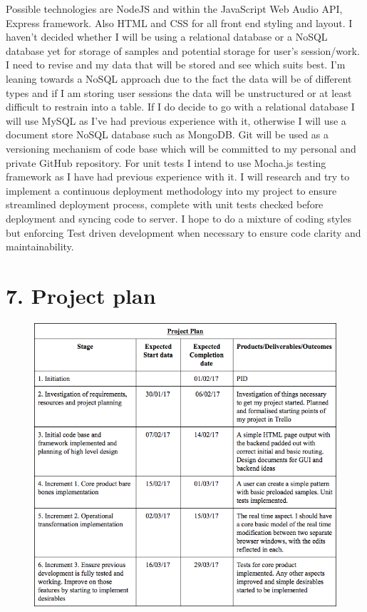 \documentclass[a4paper]{article}
\begin{document}
Possible technologies are NodeJS and within the JavaScript Web Audio API, Express framework. Also HTML and CSS for all front end styling and layout. I haven't decided whether I will be using a relational database or a NoSQL database yet for storage of samples and potential storage for user's session/work. I need to revise and my data that will be stored and see which suits best. I'm leaning towards a NoSQL approach due to the fact the data will be of different types and if I am storing user sessions the data will be unstructured or at least difficult to restrain into a table. If I do decide to go with a relational database I will use MySQL as I've had previous experience with it, otherwise I will use a document store NoSQL database such as MongoDB. Git will be used as a versioning mechanism of code base which will be committed to my personal and private GitHub repository. For unit tests I intend to use Mocha.js testing framework as I have had previous experience with it. I will research and try to implement a continuous deployment methodology into my project to ensure streamlined deployment process, complete with unit tests checked before deployment and syncing code to server. I hope to do a mixture of coding styles but enforcing Test driven development when necessary to ensure code clarity and maintainability.

\section{7. Project plan}

\begin{figure}

    \includegraphics[width=\linewidth]{img/project-plan-table.png}

\end{figure}
\end{document}
